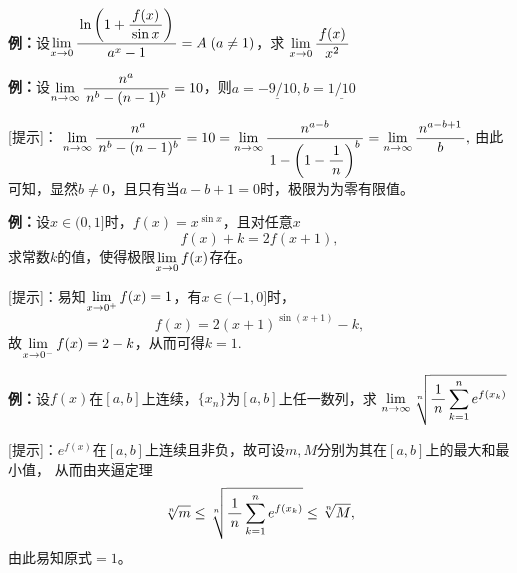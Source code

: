 {\bf 例：}设$\limx0\df{\ln\left(1+\df{f(x)}{\sin x}\right)}{a^x-1}=A\;(a\ne 1)$，求
$\limx0\df{f(x)}{x^2}$

{\bf 例：}设$\limn\df{n^a}{n^b-(n-1)^b}=10$，则$a=\underline{-9/10},
b=\underline{1/10}$

[提示]：
$\limn\df{n^a}{n^b-(n-1)^b}=10=\limn\df{n^{a-b}}{1-\left(1-\df1n\right)^b}
=\limn\df{n^{a-b+1}}b,$
由此可知，显然$b\ne 0$，且只有当$a-b+1=0$时，极限为为零有限值。

{\bf 例：}设$x\in(0,1]$时，$f(x)=x^{\sin x}$，且对任意$x$
$$f(x)+k=2f(x+1),$$
求常数$k$的值，使得极限$\limx0f(x)$存在。

[提示]：易知$\limx{0^+}f(x)=1$，有$x\in(-1,0]$时，
$$f(x)=2(x+1)^{\sin(x+1)}-k,$$
故$\limx{0^-}f(x)=2-k$，从而可得$k=1$.

{\bf 例：}设$f(x)$在$[a,b]$上连续，$\{x_n\}$为$[a,b]$上任一数列，求
$\limn\sqrt[n]{\df1n\sum\limits_{k=1}^ne^{f(x_k)}}$

[提示]：$e^{f(x)}$在$[a,b]$上连续且非负，故可设$m,M$分别为其在$[a,b]$上的最大和最小值，
从而由夹逼定理
$$\sqrt[n]m\leq\sqrt[n]{\df1n\sum\limits_{k=1}^ne^{f(x_k)}}\leq\sqrt[n]M,$$
由此易知原式$=1$。
